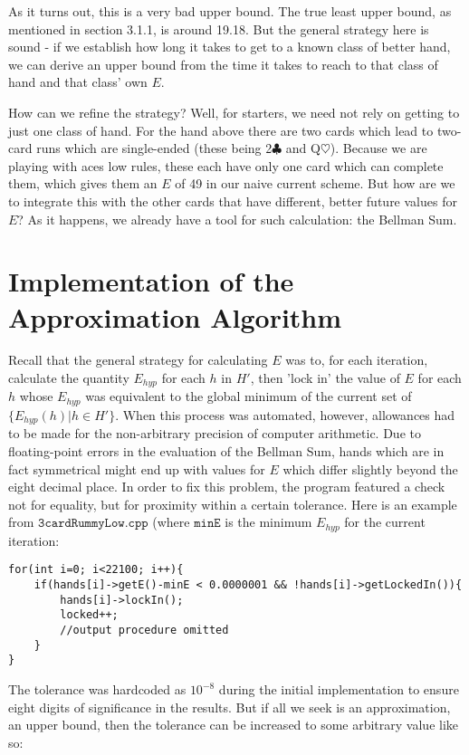 \documentclass[paper=a4, fontsize=11pt,twoside]{report}   %
\begin{document}
As it turns out, this is a very bad upper bound. The true least upper bound, as mentioned in section 3.1.1, is around 19.18. But the general strategy here is sound - if we establish how long it takes to get to a known class of better hand, we can derive an upper bound from the time it takes to reach to that class of hand and that class' own $E$.

How can we refine the strategy? Well, for starters, we need not rely on getting to just one class of hand. For the hand above there are two cards which lead to two-card runs which are single-ended (these being 2$\clubsuit$ and Q$\heartsuit$). Because we are playing with aces low rules, these each have only one card which can complete them, which gives them an $E$ of 49 in our naive current scheme. But how are we to integrate this with the other cards that have different, better future values for $E$? As it happens, we already have a tool for such calculation: the Bellman Sum.

\section{Implementation of the Approximation Algorithm}

Recall that the general strategy for calculating $E$ was to, for each iteration, calculate the quantity $E_{hyp}$ for each $h$ in $H'$, then 'lock in' the value of $E$ for each $h$ whose $E_{hyp}$ was equivalent to the global minimum of the current set of $\{E_{hyp}(h) | h \in H' \}$. When this process was automated, however, allowances had to be made for the non-arbitrary precision of computer arithmetic. Due to floating-point errors in the evaluation of the Bellman Sum, hands which are in fact symmetrical might end up with values for $E$ which differ slightly beyond the eight decimal place. In order to fix this problem, the program featured a check not for equality, but for proximity within a certain tolerance.  Here is an example from $\texttt{3cardRummyLow.cpp}$ (where $\texttt{minE}$ is the minimum $E_{hyp}$ for the current iteration:

\singlespacing
\begin{verbatim}
for(int i=0; i<22100; i++){
    if(hands[i]->getE()-minE < 0.0000001 && !hands[i]->getLockedIn()){
        hands[i]->lockIn();
        locked++;
        //output procedure omitted
    }
}
\end{verbatim}
\doublespacing
The tolerance was hardcoded as $10^{-8}$ during the initial implementation to ensure eight digits of significance in the results. But if all we seek is an approximation, an upper bound, then the tolerance can be increased to some arbitrary value like so:
\end{document}
